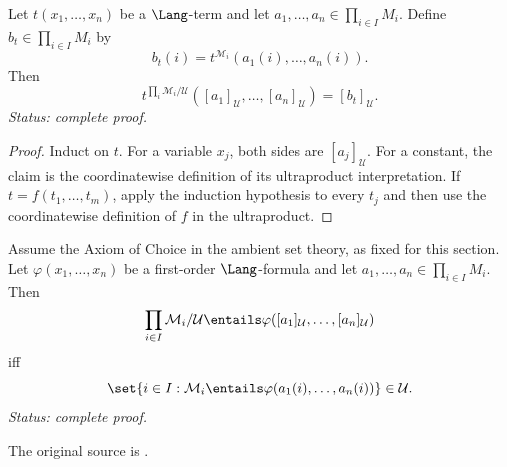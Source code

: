 \begin{lemma}
\label{lem:los-terms}
Let \(t(x_1,\ldots,x_n)\) be a \(\Lang\)-term and let
\(a_1,\ldots,a_n\in\prod_{i\in I}M_i\).  Define
\(b_t\in\prod_{i\in I}M_i\) by
\[
  b_t(i)=t^{\mathcal M_i}(a_1(i),\ldots,a_n(i)).
\]
Then
\[
  t^{\prod_i\mathcal M_i/\mathcal U}
  ([a_1]_{\mathcal U},\ldots,[a_n]_{\mathcal U})
  =[b_t]_{\mathcal U}.
\]
\textit{Status: complete proof.}
\end{lemma}

\begin{proof}
Induct on \(t\).  For a variable \(x_j\), both sides are
\([a_j]_{\mathcal U}\).  For a constant, the claim is the coordinatewise
definition of its ultraproduct interpretation.  If
\(t=f(t_1,\ldots,t_m)\), apply the induction hypothesis to every \(t_j\) and
then use the coordinatewise definition of \(f\) in the ultraproduct.
\end{proof}

\begin{theorem}[\L o\'s's theorem]
\label{thm:los}
Assume the Axiom of Choice in the ambient set theory, as fixed for this
section.  Let \(\varphi(x_1,\ldots,x_n)\) be a first-order
\(\Lang\)-formula and let
\(a_1,\ldots,a_n\in\prod_{i\in I}M_i\).  Then
\[
  \prod_{i\in I}\mathcal M_i/\mathcal U
  \entails\varphi([a_1]_{\mathcal U},\ldots,[a_n]_{\mathcal U})
\]
iff
\[
  \set{i\in I:\mathcal M_i\entails
  \varphi(a_1(i),\ldots,a_n(i))}\in\mathcal U.
\]
\textit{Status: complete proof.}
\end{theorem}

The original source is \cite{Los1955}.

